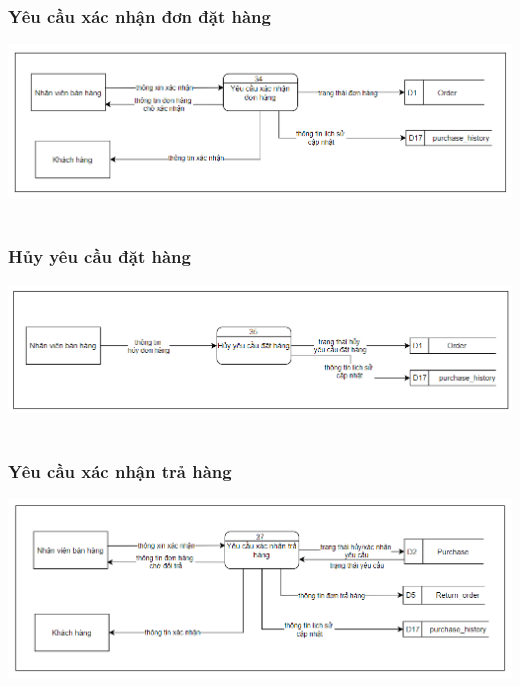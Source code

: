 \documentclass[12pt,a4paper,2sides]{report}
\begin{document}
\subsubsection{Yêu cầu xác nhận đơn đặt hàng}
    \includegraphics[width=1\linewidth]{lib/DFD/yeucauxacnhandonhang.png}\\\vspace*{1cm} 
    \hspace{4cm}{Hình 26. Yêu cầu xác nhận đơn đặt hàng}\\
\subsubsection{Hủy yêu cầu đặt hàng}
    \includegraphics[width=1\linewidth]{lib/DFD/huyyeucaudh.png}\\\vspace*{1cm} 
    \hspace{5cm}{Hình 27. Hủy yêu cầu đặt hàng}\\
\subsubsection{Yêu cầu xác nhận trả hàng}
    \includegraphics[width=1\linewidth]{lib/DFD/yeucauxacnhantrahg.png}\\\vspace*{1cm}
    \hspace{5cm}{Hình 28. Yêu cầu xác nhận trả hàng}\\
\end{document}
